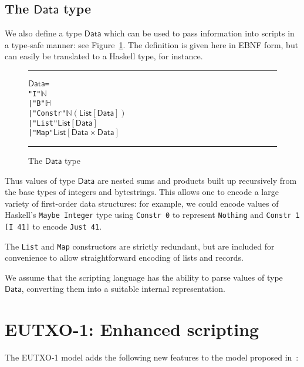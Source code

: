 \documentclass[a4paper]{article}
\newcommand{\s}{\textsf}  %
\newcommand\rfskip{7pt}
\newenvironment{ruledfigure}[1]{\begin{figure}[#1]\hrule\vspace{\rfskip}}{\vspace{\rfskip}\hrule\end{figure}}
\newcommand{\List}[1]{\ensuremath{\s{List}[#1]}}
\newcommand{\Data}{\ensuremath{\s{Data}}}
\newcommand\N{\ensuremath{\mathbb{N}}}
\renewcommand\H{\ensuremath{\mathbb{H}}}
\begin{document}
\subsection{The \Data{} type}
We also define a type \Data{} which can be used to pass information
into scripts in a type-safe manner: see Figure~\ref{fig:data-defn}. The
definition is given here in EBNF form, but can easily be translated to
a Haskell type, for instance.

\begin{ruledfigure}{H}
\begin{alltt}
  \Data =
      "I" \(\N\)
    | "B" \(\H\)
    | "Constr" \(\N (\List{\Data})\)
    | "List" \(\List{\Data}\)
    | "Map" \(\List{\Data\times\Data}\)
\end{alltt}
\caption{The \Data{} type}
\label{fig:data-defn}
\end{ruledfigure}

\noindent Thus values of type \Data{} are nested sums and products
built up recursively from the base types of integers and
bytestrings. This allows one to encode a large variety of first-order
data structures: for example, we could encode values of Haskell's
\verb|Maybe Integer| type using \verb|Constr 0| to represent
\verb|Nothing| and \verb|Constr 1 [I 41]| to encode \verb|Just 41|.


The \texttt{List} and \texttt{Map} constructors are strictly
redundant, but are included for convenience to allow straightforward
encoding of lists and records.

We assume that the scripting language has the ability to parse values
of type \Data{}, converting them into a suitable internal representation.


\section{EUTXO-1: Enhanced scripting}
\label{sec:eutxo-1}
The EUTXO-1 model adds the following new features to the model
proposed in~\citep{Zahnentferner18-UTxO}:
\end{document}
